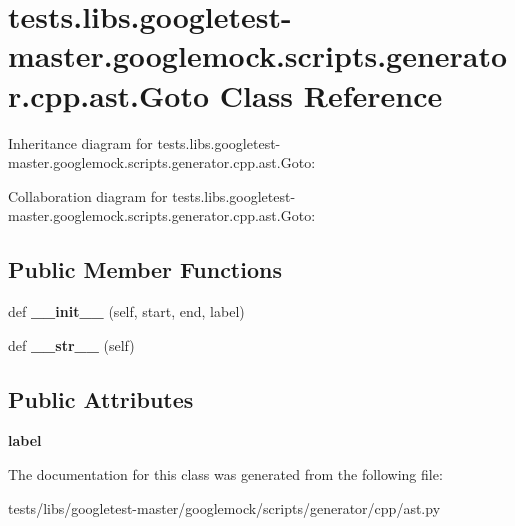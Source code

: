 \hypertarget{classtests_1_1libs_1_1googletest-master_1_1googlemock_1_1scripts_1_1generator_1_1cpp_1_1ast_1_1Goto}{}\section{tests.\+libs.\+googletest-\/master.googlemock.\+scripts.\+generator.\+cpp.\+ast.\+Goto Class Reference}
\label{classtests_1_1libs_1_1googletest-master_1_1googlemock_1_1scripts_1_1generator_1_1cpp_1_1ast_1_1Goto}


Inheritance diagram for tests.\+libs.\+googletest-\/master.googlemock.\+scripts.\+generator.\+cpp.\+ast.\+Goto\+:


Collaboration diagram for tests.\+libs.\+googletest-\/master.googlemock.\+scripts.\+generator.\+cpp.\+ast.\+Goto\+:
\subsection*{Public Member Functions}
\begin{DoxyCompactItemize}
\item 
\mbox{\label{classtests_1_1libs_1_1googletest-master_1_1googlemock_1_1scripts_1_1generator_1_1cpp_1_1ast_1_1Goto_a337170e83840ee18be5e4ade7c474272}} 
def {\bfseries \+\_\+\+\_\+init\+\_\+\+\_\+} (self, start, end, label)
\item 
\mbox{\label{classtests_1_1libs_1_1googletest-master_1_1googlemock_1_1scripts_1_1generator_1_1cpp_1_1ast_1_1Goto_a16377f46ad01e30bc7daa57426b5809a}} 
def {\bfseries \+\_\+\+\_\+str\+\_\+\+\_\+} (self)
\end{DoxyCompactItemize}
\subsection*{Public Attributes}
\begin{DoxyCompactItemize}
\item 
\mbox{\label{classtests_1_1libs_1_1googletest-master_1_1googlemock_1_1scripts_1_1generator_1_1cpp_1_1ast_1_1Goto_aeb9409bcd57cea4c5d1903867fd1e65d}} 
{\bfseries label}
\end{DoxyCompactItemize}


The documentation for this class was generated from the following file\+:\begin{DoxyCompactItemize}
\item 
tests/libs/googletest-\/master/googlemock/scripts/generator/cpp/ast.\+py\end{DoxyCompactItemize}
